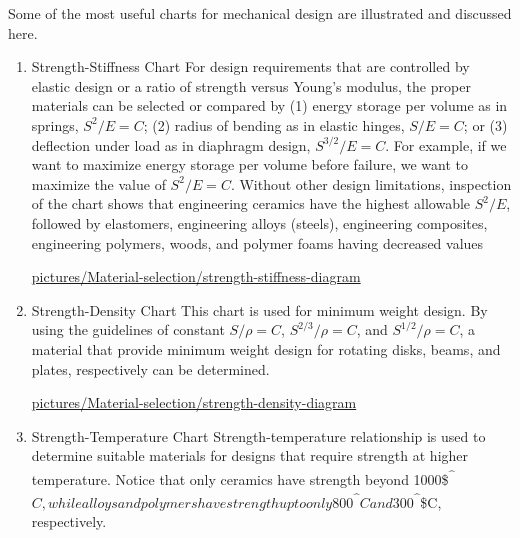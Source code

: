 \documentclass[a4paper,openany,12pt]{book}
\begin{document}
Some of the most useful charts for mechanical design are illustrated and
discussed here.

\begin{enumerate}
\item Strength-Stiffness Chart
\label{strength-stiffness-chart}
For design requirements that are controlled by elastic design or a ratio
of strength versus Young's modulus, the proper materials can be selected
or compared by (1) energy storage per volume as in springs, \(S^2/E = C\);
(2) radius of bending as in elastic hinges, \(S/E = C\); or (3) deflection
under load as in diaphragm design, \(S^{3/2}/E = C\). For example, if we
want to maximize energy storage per volume before failure, we want to
maximize the value of \(S^2/E = C\). Without other design limitations,
inspection of the chart shows that engineering ceramics have the highest
allowable \(S^2/E\), followed by elastomers, engineering alloys (steels),
engineering composites, engineering polymers, woods, and polymer foams
having decreased values


\cite{ashby2010materials}
\url{pictures/Material-selection/strength-stiffness-diagram}

\item Strength-Density Chart
\label{strength-density-chart}
This chart is used for minimum weight design. By using the guidelines of
constant \(S/\rho = C\), \(S^{2/3}/\rho = C\), and \(S^{1/2}/\rho = C\), a
material that provide minimum weight design for rotating disks, beams,
and plates, respectively can be determined.


\url{pictures/Material-selection/strength-density-diagram}

\item Strength-Temperature Chart
\label{strength-temperature-chart}
Strength-temperature relationship is used to determine suitable
materials for designs that require strength at higher temperature.
Notice that only ceramics have strength beyond 1000\$\textsuperscript{\^{}}\(C, while
alloys and polymers have strength up to only 800\)\textsuperscript{\^{}}\(C and
300\)\textsuperscript{\^{}}\$C, respectively.



\end{enumerate}
\end{document}

